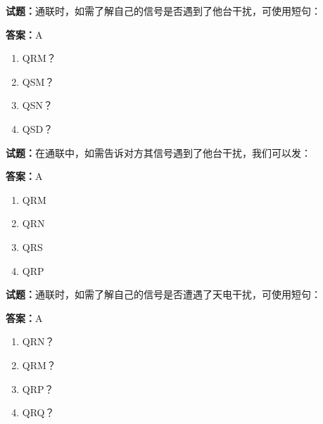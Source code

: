 \documentclass{ctexbook}
\begin{document}




\vspace{1em}

\textbf{试题：}通联时，如需了解自己的信号是否遇到了他台干扰，可使用短句： 

\textbf{答案：}A 

\begin{enumerate}[leftmargin=3em]
  \item QRM？ 

  \item QSM？ 

  \item QSN？ 

  \item QSD？ 

\end{enumerate}





\vspace{1em}

\textbf{试题：}在通联中，如需告诉对方其信号遇到了他台干扰，我们可以发： 

\textbf{答案：}A 

\begin{enumerate}[leftmargin=3em]
  \item QRM 


  \item QRN 

  \item QRS 

  \item QRP 

\end{enumerate}





\vspace{1em}

\textbf{试题：}通联时，如需了解自己的信号是否遭遇了天电干扰，可使用短句： 

\textbf{答案：}A 

\begin{enumerate}[leftmargin=3em]
  \item QRN？ 

  \item QRM？ 

  \item QRP？ 

  \item QRQ？ 

\end{enumerate}
\end{document}
